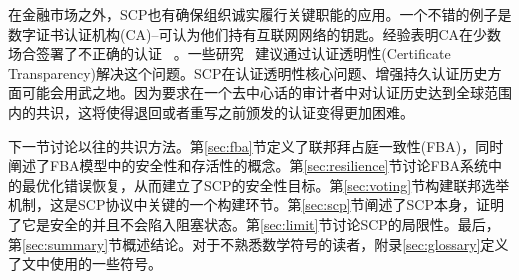 在金融市场之外，SCP也有确保组织诚实履行关键职能的应用。一个不错的例子是数字证书认证机构(CA)--可认为他们持有互联网网络的钥匙。经验表明CA在少数场合签署了不正确的认证~\cite{ac_ms2013,dc_google2015} 。一些研究~\cite{Kim:2013up,ct_google2013,Basin:2014bn,cryptoeprint:2014:1004} 建议通过认证透明性(Certificate Transparency){}解决这个问题。SCP在认证透明性核心问题、增强持久认证历史方面可能会用武之地。因为要求在一个去中心话的审计者中对认证历史达到全球范围内的共识，这将使得退回或者重写之前颁发的认证变得更加困难。

下一节讨论以往的共识方法。第\ref{sec:fba}节定义了联邦拜占庭一致性(FBA)，同时阐述了FBA模型中的安全性和存活性的概念。第\ref{sec:resilience}节讨论FBA系统中的最优化错误恢复，从而建立了SCP的安全性目标。第\ref{sec:voting}节构建联邦选举机制，这是SCP协议中关键的一个构建环节。第\ref{sec:scp}节阐述了SCP本身，证明了它是安全的并且不会陷入阻塞状态。第\ref{sec:limit}节讨论SCP的局限性。最后，第\ref{sec:summary}节概述结论。对于不熟悉数学符号的读者，附录\ref{sec:glossary}定义了文中使用的一些符号。